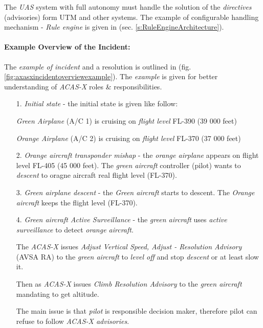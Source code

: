 \begin{note}
    The \emph{UAS} system with full autonomy must handle the solution of the \emph{directives} (advisories) form UTM and other systems. The example of configurable handling mechanism - \emph{Rule engine} is given in (sec. \ref{s:RuleEngineArchitecture}).
\end{note}

\paragraph{Example Overview of the Incident:} The \emph{example of incident} and  a resolution is outlined in (fig. \ref{fig:axasxincidentoverviewexample}). The \emph{example} is given for better understanding of \emph{ACAS-X} roles \& responsibilities. 

\begin{itemize}
    \item[1.] \emph{Initial state} - the initial state is given like follow:
    
    \emph{Green Airplane} (A/C 1) is cruising on \emph{flight level} FL-390 (39 000 feet)
    
    \emph{Orange Airplane} (A/C 2) is cruising on \emph{flight level} FL-370 (37 000 feet)
    
    \item[2.] \emph{Orange aircraft transponder mishap} - the \emph{orange airplane} appears on flight level FL-405 (45 000 feet).  The \emph{green aircraft} controller (pilot) wants to \emph{descent} to oragne aircraft real flight level (FL-370). 
    
    \item[3.] \emph{Green airplane descent} - the \emph{Green aircraft} starts to descent. The \emph{Orange aircraft} keeps the flight level (FL-370). 
    
    \item[4.] \emph{Green aircraft Active Surveillance} - the \emph{green aircraft} uses \emph{active surveillance} to detect \emph{orange aircraft}. 
    
    The \emph{ACAS-X} issues \emph{Adjust Vertical Speed, Adjust - Resolution Advisory} (AVSA RA) to  the \emph{green aircraft} to \emph{level off} and stop \emph{descent} or at least slow it.
    
    Then as \emph{ACAS-X} issues \emph{Climb Resolution Advisory} to the \emph{green aircraft} mandating to get altitude. 
    
    \begin{note}
        The main issue is that \emph{pilot} is responsible decision maker, therefore pilot can refuse to follow \emph{ACAS-X advisories}.
    \end{note}
    

\end{itemize}
